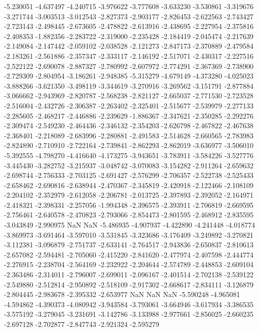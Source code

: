 -5.230051
-4.637497
-4.240715
-3.976622
-3.777608
-3.633230
-3.530861
-3.319676
-3.271744
-3.003513
-3.012543
-2.827373
-2.903177
-2.826453
-2.622563
-2.743427
-2.723143
-2.498445
-2.673605
-2.478822
-2.613916
-2.438695
-2.227954
-2.375816
-2.408353
-1.882356
-2.283722
-2.319000
-2.235428
-2.184419
-2.045474
-2.217639
-2.149084
-2.147442
-2.059102
-2.038528
-2.121273
-2.847173
-2.370889
-2.479584
-2.183261
-2.561886
-2.357347
-2.333117
-2.146192
-2.517071
-2.430317
-2.227516
-2.522122
-2.690078
-2.887327
-2.780992
-2.607972
-2.774291
-2.367369
-2.738900
-2.729309
-2.804954
-3.186261
-2.948385
-5.315279
-4.679149
-4.373280
-4.025023
-3.888266
-3.621350
-3.498119
-3.344619
-3.270916
-3.269562
-3.151791
-2.877884
-3.066662
-2.943969
-2.820787
-2.568238
-2.821127
-2.665037
-2.771530
-2.723528
-2.516004
-2.432726
-2.306387
-2.263402
-2.325401
-2.515677
-2.539979
-2.277133
-2.285605
-2.468217
-2.446886
-2.239629
-1.886367
-2.347621
-2.350285
-2.292276
-2.309474
-2.549230
-2.464436
-2.346132
-2.354203
-2.626798
-2.467822
-2.467638
-2.368401
-2.218089
-2.683996
-2.280881
-2.491583
-2.514628
-2.660565
-2.783983
-2.824890
-2.710910
-2.722164
-2.739841
-2.862293
-2.862019
-3.636977
-3.506010
-5.392555
-4.798270
-4.416640
-4.173275
-3.943651
-3.783911
-3.584226
-3.527776
-3.445430
-3.282752
-3.215937
-3.048742
-3.070083
-3.154282
-2.911264
-2.659632
-2.698744
-2.756333
-2.703125
-2.691427
-2.576299
-2.706357
-2.522738
-2.525433
-2.658462
-2.690816
-2.638944
-2.470367
-2.345819
-2.420918
-2.122466
-2.108109
-2.204102
-2.352979
-2.612058
-2.206781
-2.013725
-2.397893
-2.392052
-2.164971
-2.418321
-2.398331
-2.257056
-1.994348
-2.396575
-2.393911
-2.706819
-2.669595
-2.756461
-2.640578
-2.470823
-2.793066
-2.854473
-2.801595
-2.468912
-2.835595
-3.043849
-2.990975
NaN
NaN
-5.486935
-4.907937
-4.422890
-4.241448
-4.018774
-3.869973
-3.691464
-3.597010
-3.531845
-3.323686
-3.176409
-3.249892
-3.270821
-3.112381
-3.096879
-2.751737
-2.633141
-2.764517
-2.943836
-2.650837
-2.810613
-2.657082
-2.594481
-2.705060
-2.415220
-2.841620
-2.477974
-2.407598
-2.444774
-2.276915
-2.238704
-2.564169
-2.232922
-2.204644
-2.574789
-2.448853
-2.609104
-2.363486
-2.314011
-2.796007
-2.699011
-2.096167
-2.401514
-2.702138
-2.539122
-2.549880
-2.512814
-2.950892
-2.518109
-2.917302
-2.668617
-2.834111
-3.126879
-2.804445
-2.983678
-2.395332
-2.653977
NaN
NaN
NaN
-5.590248
-4.965081
-4.594862
-4.390373
-4.080942
-3.943584
-3.793061
-3.664946
-3.617934
-3.386535
-3.575192
-3.279045
-3.231691
-3.142786
-3.133988
-2.977661
-2.856025
-2.660235
-2.697128
-2.702877
-2.847743
-2.921324
-2.595279
